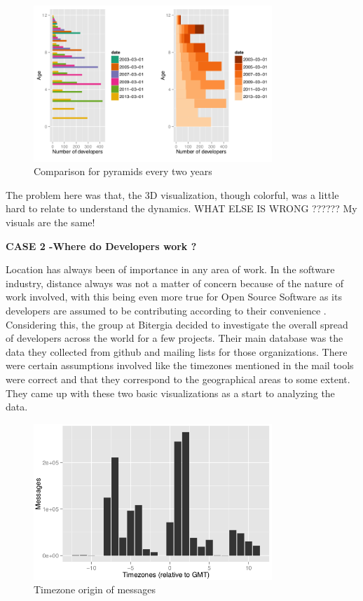 \documentclass[double,12pt]{beavtex}
\begin{document}
\begin{figure}[!ht]
\centering
\includegraphics[width=90mm]{age1.png}
\caption{Comparison for pyramids every two years}
\end{figure}

The problem here was that, the 3D visualization, though colorful, was a little hard to relate to understand the dynamics. WHAT ELSE IS WRONG ?????? My visuals are the same!

 \textbf{CASE 2 -Where do Developers work ?}

Location has always been of importance in any area of work. In the software industry, distance always was not a matter of concern because of the nature of work involved, with this being even more true for Open Source Software as its developers are assumed to be contributing according to their convenience \cite{yuri2010}. Considering this, the group at Bitergia decided to investigate the overall spread of developers across the world for a few projects. Their main database was the data they collected from github and mailing lists for those organizations. There were certain assumptions involved like the timezones mentioned in the mail tools were correct and that they correspond to the geographical areas to some extent. They came up with these two basic visualizations as a start to analyzing the data.

\begin{figure}[!ht]
\centering
\includegraphics[width=90mm]{work1.png}
\caption{Timezone origin of messages}
\end{figure}
\end{document}
